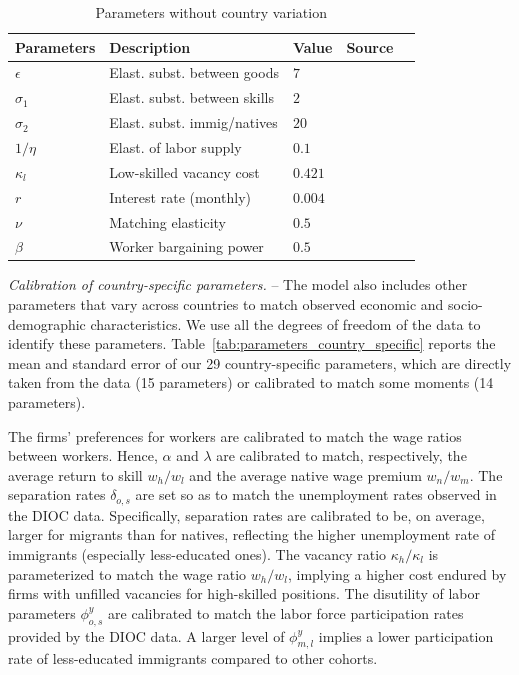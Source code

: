 \documentclass[a4paper,12pt]{article}
\begin{document}
\begin{table}[htb!]
\centering
\par
\caption{Parameters without country variation}
\label{tab:general_parameters}
\footnotesize
\begin{tabular}{lllll}
\hline\hline
Parameters & Description & Value & Source \\ \hline
$\epsilon $ & Elast. subst. between goods & $7$ & \cite{Feenstra1994}\\
$\sigma_1$ & Elast. subst. between skills & $2$ & \cite{Ottaviano2012}\\
$\sigma_2$ & Elast. subst. immig/natives & $20$ & \cite{Ottaviano2012}\\
$1/ \eta$ & Elast. of labor supply & $0.1$ & \cite{Evers2008}\\
$\kappa_l$ & Low-skilled vacancy cost & $0.421$ & \cite{Chassamboulli2014}\\
$r$ & Interest rate (monthly) & $0.004$ & \cite{Chassamboulli2014}\\
$\nu$ & Matching elasticity & $0.5$ & \cite{Petrongolo2001}\\
$ \beta$ & Worker bargaining power & $0.5$ & \cite{Hosios1990}\\
 \hline\hline
\end{tabular}
\end{table}

\emph{Calibration of country-specific parameters.} -- The model also includes other parameters that vary across countries to match observed economic and socio-demographic characteristics. We use all the degrees of freedom of the data to identify these parameters. Table~\ref{tab:parameters_country_specific} reports the mean and standard error of our 29 country-specific parameters, which are directly taken from the data (15 parameters) or calibrated to match some moments (14 parameters).

The firms’ preferences for workers are calibrated to match the wage ratios between workers. Hence, $\alpha$ and $\lambda$ are calibrated to match, respectively, the average return to skill $w_h/w_l$ and the average native wage premium $w_n/w_m$. The separation rates $\delta_{o,s}$ are set so as to match the unemployment rates observed in the DIOC data. Specifically, separation rates are calibrated to be, on average, larger for migrants than for natives, reflecting the higher unemployment rate of immigrants (especially less-educated ones). The vacancy ratio $\kappa_h / \kappa_l$ is parameterized to match the wage ratio $w_h/w_l$, implying a higher cost endured by firms with unfilled vacancies for high-skilled positions. The disutility of labor parameters $\phi^y_{o,s}$ are calibrated to match the labor force participation rates provided by the DIOC data. A larger level of $\phi^y_{m,l}$ implies a lower participation rate of less-educated immigrants compared to other cohorts.
\end{document}
